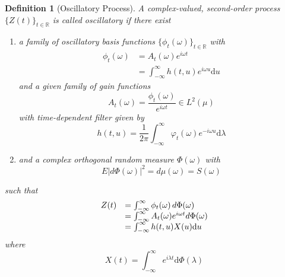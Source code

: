 \documentclass{article}
\newcommand{\mathd}{\mathrm{d}}
\newcommand{\tmem}[1]{{\em #1\/}}
\newtheorem{definition}{Definition}
\begin{document}
\begin{definition}
  [Oscillatory Process]\label{def:oscillatory} A complex-valued, second-order
  process $\{Z (t) \}_{t \in \mathbb{R}}$ is called {\tmem{oscillatory}} if
  there exist
  \begin{enumerate}
    \item a family of oscillatory basis functions $\{\phi_t (\omega)\}_{t \in
    \mathbb{R}}$ with
    \begin{equation}
      \begin{array}{ll}
        \phi_t (\omega) & = A_t (\omega) e^{i \omega t}\\
        & = \int_{- \infty}^{\infty} h (t, u) e^{i \omega u} \mathd u
      \end{array}
    \end{equation}
    and a given family of gain functions
    \begin{equation}
      A_t (\omega) = \frac{\phi_t (\omega)}{e^{i \omega t}} \in L^2 (\mu)
      \label{envelope}
    \end{equation}
    with time-dependent filter given by
    \begin{equation}
      h (t, u) = \frac{1}{2 \pi} \int_{- \infty}^{\infty} \varphi_t (\omega)
      e^{- i \omega u} \mathd \lambda
    \end{equation}
    \item and a complex orthogonal random measure $\Phi (\omega)$ with
    \begin{equation}
      E \lvert d \Phi (\omega) \rvert^2 = d \mu (\omega) = S (\omega)
    \end{equation}
  \end{enumerate}
  such that
  \begin{equation}
    \label{eq:oscillatory_rep} \begin{array}{ll}
      Z (t) & = \int_{- \infty}^{\infty} \phi_t (\omega)  \hspace{0.17em} d
      \Phi (\omega)\\
      & = \int_{- \infty}^{\infty} A_t (\omega) e^{i \omega t} d \Phi
      (\omega)\\
      & = \int_{- \infty}^{\infty} h (t, u) X (u) \mathd u
    \end{array}
  \end{equation}
  where
  \begin{equation}
    X (t) = \int_{- \infty}^{\infty} e^{i \lambda t} \mathd \Phi (\lambda)
  \end{equation}
\end{definition}
\end{document}
